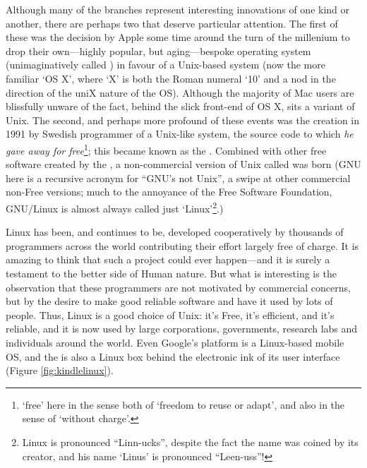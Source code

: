 Although many of the branches represent interesting innovations of one kind or another, there are perhaps two that deserve particular attention. The first of these was the decision by Apple some time around the turn of the millenium to drop their own---highly popular, but aging---bespoke operating system (unimaginatively called ) in favour of a Unix-based system (now the more familiar `OS X', where `X' is both the Roman numeral `10' and a nod in the direction of the uniX nature of the OS). Although the majority of Mac users are blissfully unware of the fact, behind the slick front-end of OS X, sits a variant of Unix. The second, and perhaps more profound of these events was the creation in 1991 by Swedish programmer  of a Unix-like system, the source code to which \emph{he gave away for free}\footnote{`free' here in the sense both of `freedom to reuse or adapt', and also in the sense of `without charge'.}; this became known as the . Combined with other free software created by the , a non-commercial version of Unix called  was born (GNU here is a recursive acronym for ``GNU's not Unix'', a swipe at other commercial non-Free versions; much to the annoyance of the Free Software Foundation, GNU/Linux is almost always called just `Linux'\footnote{Linux
is pronounced ``Linn-ucks'', despite the fact the name was coined by
its creator, and his name `Linus' is pronounced
``Leen-uss''!}.) 

Linux has been, and continues to be, developed cooperatively by
thousands of programmers across the world contributing their effort
largely free of charge. It is amazing to think that such
a project could ever happen---and it is surely a testament to the
better side of Human nature. But what is interesting is the
observation that these programmers are not motivated by commercial
concerns, but by the desire to make good reliable software and have it
used by lots of people. Thus, Linux is a good choice of Unix: it's
Free, it's efficient, and it's reliable, and it is now used by large corporations, governments, research labs and individuals around the world. Even Google's  platform is a Linux-based mobile OS, and the   is also a Linux box behind the electronic ink of its user interface (Figure \ref{fig:kindlelinux}).

